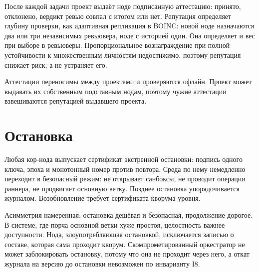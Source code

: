 После каждой задачи проект выдаёт ноде подписанную аттестацию: принято, отклонено, вердикт ревью совпал с итогом или нет. Репутация определяет глубину проверки, как адаптивная репликация в BOINC: новой ноде назначаются два или три независимых ревьювера, ноде с историей один. Она определяет и вес при выборе в ревьюверы. Пропорциональное вознаграждение при полной устойчивости к множественным личностям недостижимо, поэтому репутация снижает риск, а не устраняет его.

Аттестации переносимы между проектами и проверяются офлайн. Проект может выдавать их собственным подставным нодам, поэтому чужие аттестации взвешиваются репутацией выдавшего проекта.

\section{Остановка}

Любая кор-нода выпускает сертификат экстренной остановки: подпись одного ключа, эпоха и монотонный номер против повтора. Среда по нему немедленно переходит в безопасный режим: не открывает санбоксы, не проводит операции раннера, не продвигает основную ветку. Позднее остановка упорядочивается журналом. Возобновление требует сертификата кворума уровня.

\begin{whybox}
Асимметрия намеренная: остановка дешёвая и безопасная, продолжение дорогое. В системе, где порча основной ветки хуже простоя, целостность важнее доступности. Нода, злоупотребляющая остановкой, исключается записью о составе, которая сама проходит кворум. Скомпрометированный оркестратор не может заблокировать остановку, потому что она не проходит через него, а откат журнала на версию до остановки невозможен по инварианту I8.
\end{whybox}
